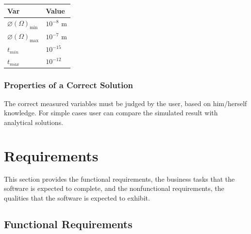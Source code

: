 \documentclass[12pt]{article}
\begin{document}
\begin{table}[!h] \caption{Specification Parameter Values} \label{TblSpecParams} \renewcommand{\arraystretch}{1.2} \noindent \begin{longtable*}{l l} \toprule \textbf{Var} & \textbf{Value} \\ \midrule $\varnothing(\Omega)_{\text{min}}$ & $10^{-8}$ \si{\metre}\\ $\varnothing(\Omega)_{\text{max}}$ & $10^{-7}$ \si{\metre}\\ $t_{min}$ & $10^{-15}$\\ $t_{max}$ & $10^{-12}$\\
		
		
		\bottomrule \end{longtable*} \end{table}

	\subsubsection{Properties of a Correct Solution} \label{sec_CorrectSolution}
	
	The correct measured variables must be judged by the user, based on him/herself
	knowledge. For simple cases user can compare the simulated result with
	analytical solutions.
	
	
	
	\section{Requirements}
	
	
	This section provides the functional requirements, the business tasks that the
	software is expected to complete, and the nonfunctional requirements, the
	qualities that the software is expected to exhibit.
	
	\subsection{Functional Requirements}
	
\end{document}
